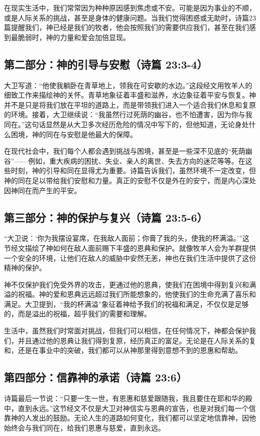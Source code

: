 \documentclass[a4paper, 12pt]{article}
\begin{document}
在现实生活中，我们常常因为种种原因感到焦虑或不安。可能是因为事业的不顺，或是人际关系的挑战，甚至是身体的健康问题。当我们觉得困惑或无助时，诗篇23篇提醒我们，神已经是我们的牧者，他会按照我们的需要供应我们，甚至在我们感到最脆弱时，神的力量和爱会加倍显现。
\subsection*{第二部分：神的引导与安慰（诗篇 23:3-4）}
\hspace{0.6cm}大卫写道：“他使我躺卧在青草地上，领我在可安歇的水边。”这段经文用牧羊人的细致工作来描绘神的关怀。青草地象征着丰盛和滋养，水边象征着平安与恢复。神并不是只是将我们放在平坦的道路上，而是带领我们进入一个适合我们休息和复原的环境。接着，大卫继续说：“我虽然行过死荫的幽谷，也不怕遭害，因为你与我同在。”这句话显然是从大卫多次经历危险的情况中写下的，但他知道，无论身处什么困境，神的同在与安慰是他最大的保障。

在现代社会中，我们每个人都会遇到挑战与困境，甚至是一些深不见底的“死荫幽谷”——例如，重大疾病的困扰、失业、亲人的离世、失去方向的迷茫等等。在这些时刻，神的引导和同在显得尤为重要。诗篇告诉我们，虽然环境不一定改变，但神的同在足以带给我们安慰和力量。真正的安慰不仅是外在的安宁，而是内心深处因神同在而产生的平安。
\subsection*{第三部分：神的保护与复兴（诗篇 23:5-6）}
\hspace{0.6cm}“大卫说：‘你为我摆设宴席，在我敌人面前；你膏了我的头，使我的杯满溢。’”这节经文描绘了神如何在敌人面前赐下丰盛的恩典和保护。就像牧羊人会为羊群提供一个安全的环境，让他们在敌人的威胁中安然无恙，神也在我们生活中提供了这份精神的保护。

神不仅保护我们免受外界的攻击，更通过他的恩典，使我们在困境中得到复兴和满溢的祝福。神的爱和恩典远远超过我们所能想象的，他使我们的生命充满了喜乐和满足。大卫提到，“我的杯满溢”象征着神给予我们的祝福和满足，不仅仅是足够的，而是溢出的祝福，超乎我们的需要和理解。

生活中，虽然我们时常面对挑战，但我们可以相信，在任何情况下，神都会保护我们，并且通过他的恩典让我们得到复原，经历真正的富足。无论是在人际关系的复和，还是在事业中的突破，我们都可以从神那里得到意想不到的恩惠和帮助。
\subsection*{第四部分：信靠神的承诺（诗篇 23:6）}
\hspace{0.6cm}诗篇最后一节说：“只要一生一世，有恩惠和慈爱跟随我，我且要住在耶和华的殿中，直到永远。”这节经文不仅是大卫对神信实与恩典的宣告，也是对我们每一个信靠神的人发出的鼓励。无论人生的道路如何变化，我们都可以坚定地信靠神，因他始终会与我们同在，给我们恩惠与慈爱，直到永远。
\end{document}
